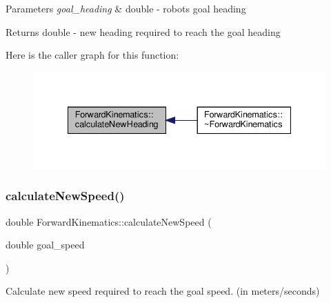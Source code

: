 \begin{DoxyParams}{Parameters}
{\em goal\+\_\+heading} & double -\/ robot\textquotesingle{}s goal heading \\
\hline
\end{DoxyParams}
\begin{DoxyReturn}{Returns}
double -\/ new heading required to reach the goal heading 
\end{DoxyReturn}
Here is the caller graph for this function\+:
\nopagebreak
\begin{figure}[H]
\begin{center}
\leavevmode
\includegraphics[width=335pt]{classForwardKinematics_a005d9cbb53f4dbb79b16defb52a8e76a_icgraph}
\end{center}
\end{figure}
\mbox{\label{classForwardKinematics_af945b5d3d508aba54ea902674a65373c}} 
\subsubsection{\texorpdfstring{calculate\+New\+Speed()}{calculateNewSpeed()}}
{\footnotesize\ttfamily double Forward\+Kinematics\+::calculate\+New\+Speed (\begin{DoxyParamCaption}\item[{double}]{goal\+\_\+speed }\end{DoxyParamCaption})}



Calculate new speed required to reach the goal speed. (in meters/seconds) 


